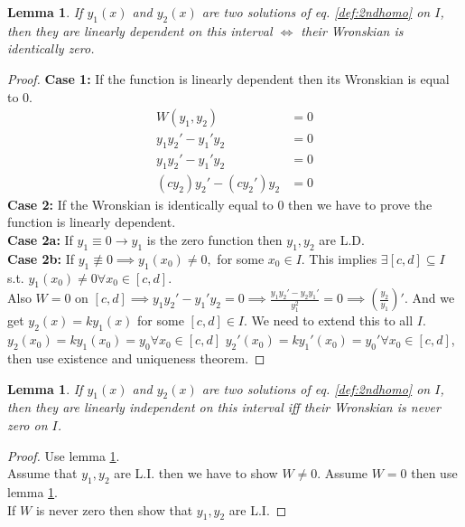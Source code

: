 \documentclass[oneside,11pt,pdftex,final]{book}%
\numberwithin{equation}{section}
\newtheorem{lemma}[theorem]{Lemma}
\numberwithin{section}{chapter}
\numberwithin{equation}{chapter}
\begin{document}
\begin{lemma}\label{lem:ldwronskian}
	If $ y_1(x) $ and $ y_2(x) $ are two solutions of eq. \ref{def:2ndhomo} on $ I $, then they are linearly dependent on this interval $ \iff $ their Wronskian is identically zero.
\end{lemma}
\begin{proof}
	\textbf{Case 1: }If the function is linearly dependent then its Wronskian is equal to 0. \begin{align*}
		W(y_1,y_2)&=0\\
		y_1y_2'-y_1'y_2&=0\\
		y_1y_2'-y_1'y_2&=0\\
		(cy_2)y_2'-(cy_2')y_2&=0
	\end{align*}
		\textbf{Case 2:} If the Wronskian is identically equal to 0 then we have to prove the function is linearly dependent.\\
		\textbf{Case 2a:} If $ y_1 \equiv 0 \rightarrow y_1 $ is the zero function then $ y_1, y_2 $ are L.D.\\
		\textbf{Case 2b:} If $ y_1 \not \equiv 0 \implies y_1(x_0)\neq 0, $ for some $ x_0 \in I $. This implies $ \exists [c,d] \subseteq I $ s.t. $ y_1(x_0)\neq0 \forall x_0 \in [c,d]$.\\
		Also $ W=0$ on $ [c,d]  \implies y_1 y_2'-y_1'y_2=0 \implies \frac{y_1y_2'-y_2 y_1'}{y_1^2} =0 \implies \left( \frac{y_2}{y_1}\right)'$. And we get $ y_2(x)=ky_1(x) $ for some $ [c,d] \in I$. We need to extend this to all $ I $. $ y_2(x_0)=ky_1(x_0)=y_0 \forall x_0 \in [c,d] $ $ y_2'(x_0)=ky_1'(x_0)=y_0' \forall x_0 \in [c,d] $, then use existence and uniqueness theorem.
\end{proof}

\begin{lemma}
	If $ y_1(x) $ and $ y_2(x) $ are two solutions of eq. \ref{def:2ndhomo} on $ I $, then they are linearly independent on this interval iff their Wronskian is never zero on $ I $.
\end{lemma}
\begin{proof}
	Use lemma \ref{lem:ldwronskian}.\\
	Assume that $ y_1, y_2 $ are L.I. then we have to show $ W \neq 0 $. Assume $ W=0 $ then use lemma \ref{lem:ldwronskian}.\\
	If $ W $ is never zero then show that $ y_1, y_2 $ are L.I.
\end{proof}
\end{document}
